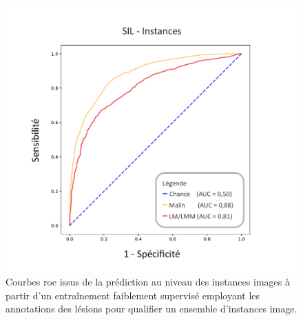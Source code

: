 \begin{figure}[H]
    \centering
    \includegraphics[width=\linewidth]{contents/chapter_6/resources/results_lesion_roc_instances.pdf}
    \caption{Courbes \gls{roc} issus de la prédiction au niveau des instances images à partir d'un entraînement faiblement supervisé employant les annotations des lésions pour qualifier un ensemble d'instances image.}
    \label{fig:results_lesion_roc_instances}
\end{figure}\par

